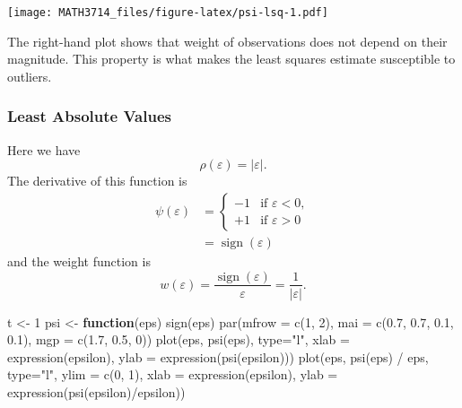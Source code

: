 \documentclass[
  a4paper,
]{article}
\newenvironment{Shaded}{\begin{snugshade}}{\end{snugshade}}
\newcommand{\AttributeTok}[1]{\textcolor[rgb]{0.77,0.63,0.00}{#1}}
\newcommand{\ControlFlowTok}[1]{\textcolor[rgb]{0.13,0.29,0.53}{\textbf{#1}}}
\newcommand{\DecValTok}[1]{\textcolor[rgb]{0.00,0.00,0.81}{#1}}
\newcommand{\FloatTok}[1]{\textcolor[rgb]{0.00,0.00,0.81}{#1}}
\newcommand{\FunctionTok}[1]{\textcolor[rgb]{0.00,0.00,0.00}{#1}}
\newcommand{\NormalTok}[1]{#1}
\newcommand{\OtherTok}[1]{\textcolor[rgb]{0.56,0.35,0.01}{#1}}
\newcommand{\SpecialCharTok}[1]{\textcolor[rgb]{0.00,0.00,0.00}{#1}}
\newcommand{\StringTok}[1]{\textcolor[rgb]{0.31,0.60,0.02}{#1}}
\theoremstyle{definition}
\theoremstyle{definition}
\theoremstyle{definition}
\theoremstyle{definition}
\theoremstyle{remark}
\begin{document}
\texttt{[image: MATH3714\_files/figure-latex/psi-lsq-1.pdf]}

The right-hand plot shows that weight of observations does not depend
on their magnitude. This property is what makes the least squares estimate
susceptible to outliers.

\hypertarget{least-absolute-values}{%
\subsubsection{Least Absolute Values}\label{least-absolute-values}}

Here we have
\begin{equation*}
  \rho(\varepsilon)
  = |\varepsilon|.
\end{equation*}
The derivative of this function is
\begin{align*}
  \psi(\varepsilon)
  &= \begin{cases}
    -1 & \mbox{if } \varepsilon< 0, \\
    +1 & \mbox{if } \varepsilon> 0
  \end{cases} \\
  &= \mathop{\mathrm{sign}}(\varepsilon)
\end{align*}
and the weight function is
\begin{equation*}
  w(\varepsilon)
  = \frac{\mathop{\mathrm{sign}}(\varepsilon)}{\varepsilon}
  = \frac{1}{|\varepsilon|}.
\end{equation*}

\begin{Shaded}
\begin{Highlighting}[]
\NormalTok{t }\OtherTok{\textless{}{-}} \DecValTok{1}
\NormalTok{psi }\OtherTok{\textless{}{-}} \ControlFlowTok{function}\NormalTok{(eps) }\FunctionTok{sign}\NormalTok{(eps)}
\FunctionTok{par}\NormalTok{(}\AttributeTok{mfrow =} \FunctionTok{c}\NormalTok{(}\DecValTok{1}\NormalTok{, }\DecValTok{2}\NormalTok{),}
    \AttributeTok{mai =} \FunctionTok{c}\NormalTok{(}\FloatTok{0.7}\NormalTok{, }\FloatTok{0.7}\NormalTok{, }\FloatTok{0.1}\NormalTok{, }\FloatTok{0.1}\NormalTok{),}
    \AttributeTok{mgp =} \FunctionTok{c}\NormalTok{(}\FloatTok{1.7}\NormalTok{, }\FloatTok{0.5}\NormalTok{, }\DecValTok{0}\NormalTok{))}
\FunctionTok{plot}\NormalTok{(eps, }\FunctionTok{psi}\NormalTok{(eps), }\AttributeTok{type=}\StringTok{"l"}\NormalTok{,}
     \AttributeTok{xlab =} \FunctionTok{expression}\NormalTok{(epsilon), }\AttributeTok{ylab =} \FunctionTok{expression}\NormalTok{(}\FunctionTok{psi}\NormalTok{(epsilon)))}
\FunctionTok{plot}\NormalTok{(eps, }\FunctionTok{psi}\NormalTok{(eps) }\SpecialCharTok{/}\NormalTok{ eps, }\AttributeTok{type=}\StringTok{"l"}\NormalTok{, }\AttributeTok{ylim =} \FunctionTok{c}\NormalTok{(}\DecValTok{0}\NormalTok{, }\DecValTok{1}\NormalTok{),}
     \AttributeTok{xlab =} \FunctionTok{expression}\NormalTok{(epsilon),}
     \AttributeTok{ylab =} \FunctionTok{expression}\NormalTok{(}\FunctionTok{psi}\NormalTok{(epsilon)}\SpecialCharTok{/}\NormalTok{epsilon))}
\end{Highlighting}
\end{Shaded}
\end{document}
